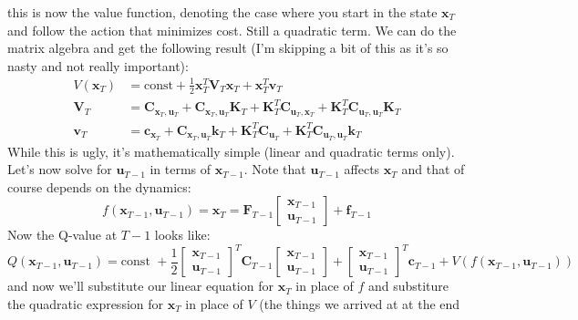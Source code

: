 \documentclass{report}
\begin{document}
this is now the value function, denoting the case where
you start in the state $ \bm{x}_{T}  $ and follow the action that minimizes cost.
Still a quadratic term.
We can do the matrix algebra and get the following result (I'm skipping a bit of this as it's so nasty and not really important):
\begin{align}
V (\bm{x}_{T}) &= \text{const} + \frac{1}{2} \bm{x}_{T}^{ T } \bm{V}_{T} \bm{x}_{T} + \bm{x}_{T}^{ T }\bm{v}_{T} \\
\bm{V}_{T} &= \bm{C}_{\bm{x}_{T}, \bm{u}_{T}} + \bm{C}_{\bm{x}_{T}, \bm{u}_{T}} \bm{K}_{T} 
+ \bm{K}_{T}^{ T } \bm{C}_{\bm{u}_{T}, \bm{x}_{T}} + \bm{K}_{T}^{ T } \bm{C}_{\bm{u}_{T},\bm{u}_{T} }\bm{K}_{T}\\
\bm{v}_{T} &= \bm{c}_{\bm{x}_{T}} + \bm{C}_{\bm{x}_{T}, \bm{u}_{T}} \bm{k}_{T} + \bm{K}_{T}^{ T } \bm{C}_{\bm{u}_{T}} +
\bm{K}_{T}^{ T } \bm{C}_{\bm{u}_{T}, \bm{u}_{T}} \bm{k}_{T}
\end{align}
While this is ugly, it's mathematically simple (linear and quadratic terms only).
Let's now solve for $ \bm{u}_{T-1}  $ in terms of $ \bm{x}_{T-1}  $.
Note that $ \bm{u}_{T-1}  $ affects $ \bm{x}_{T}  $ and that of course
depends on the dynamics:
\begin{equation}
f (\bm{x}_{T-1}, \bm{u}_{T-1}) = \bm{x}_{T} = \bm{F}_{T-1} 
\begin{bmatrix} \bm{x}_{T-1} \\ \bm{u}_{T-1} \end{bmatrix}  + \bm{f}_{T-1}
\end{equation}
Now the Q-value at $ T-1  $ looks like:
\begin{equation}
Q (\bm{x}_{T-1}, \bm{u}_{T-1}) =
\text{const } + \frac{1}{2} 
\begin{bmatrix} \bm{x}_{T-1} \\ \bm{u}_{T-1} \end{bmatrix}^{ T } \bm{C}_{T-1}
\begin{bmatrix} \bm{x}_{T-1} \\ \bm{u}_{T-1} \end{bmatrix} + 
\begin{bmatrix} \bm{x}_{T-1} \\ \bm{u}_{T-1} \end{bmatrix}^{ T } \bm{c}_{T-1} +
V (f (\bm{x}_{T-1}, \bm{u}_{T-1}))
\end{equation}
and now we'll substitute our linear equation for $ \bm{x}_{T}  $ in place of $ f  $ 
and substiture the quadratic expression for $ \bm{x}_{T}  $ in place of $ V  $ (the things we arrived at at the end
\end{document}
